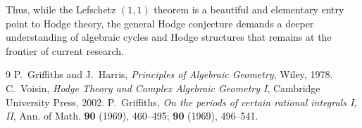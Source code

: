 \documentclass[12pt]{article}
\theoremstyle{plain}
\theoremstyle{definition}
\begin{document}
Thus, while the Lefschetz $(1,1)$ theorem is a beautiful and elementary entry point to Hodge theory, the general Hodge conjecture demands a deeper understanding of algebraic cycles and Hodge structures that remains at the frontier of current research.

\begin{thebibliography}{9}
P.~Griffiths and J.~Harris, \textit{Principles of Algebraic Geometry}, Wiley, 1978.
C.~Voisin, \textit{Hodge Theory and Complex Algebraic Geometry I}, Cambridge University Press, 2002.
P.~Griffiths, \textit{On the periods of certain rational integrals I, II}, Ann. of Math. \textbf{90} (1969), 460--495; \textbf{90} (1969), 496--541.
\end{thebibliography}
\end{document}
